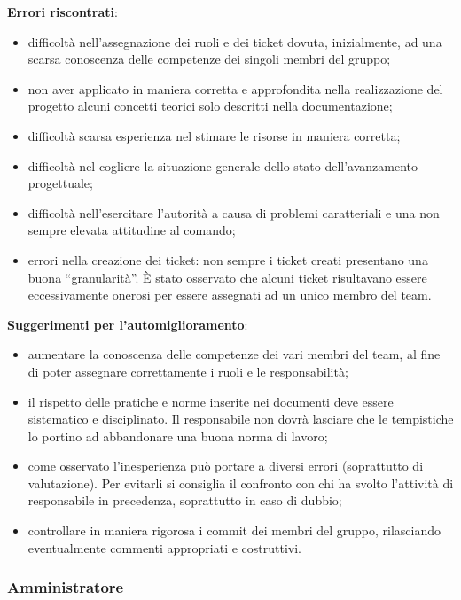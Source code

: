 \begin{description}
	\item \textbf{Errori riscontrati}:
		\begin{itemize}
			\item difficoltà nell'assegnazione dei ruoli e dei ticket dovuta, inizialmente, ad una scarsa conoscenza delle competenze dei singoli membri del gruppo;
			\item non aver applicato in maniera corretta e approfondita nella realizzazione del progetto alcuni concetti teorici solo descritti nella documentazione;
			\item difficoltà scarsa esperienza nel stimare le risorse in maniera corretta;
			\item difficoltà nel cogliere la situazione generale dello stato dell'avanzamento progettuale;
			\item difficoltà nell'esercitare l'autorità a causa di problemi caratteriali e una non sempre elevata attitudine al comando;
			\item errori nella creazione dei ticket: non sempre i ticket creati presentano una buona ``granularità''. È stato osservato che alcuni ticket risultavano essere eccessivamente onerosi per essere assegnati ad un unico membro del team.
		\end{itemize}
			
	\item \textbf{Suggerimenti per l'automiglioramento}:
		\begin{itemize}
			\item aumentare la conoscenza delle competenze dei vari membri del team, al fine di poter assegnare correttamente i ruoli e le responsabilità;
			\item il rispetto delle pratiche e norme inserite nei documenti deve essere sistematico e disciplinato. Il responsabile non dovrà lasciare che le tempistiche lo portino ad abbandonare una buona norma di lavoro;
			\item come osservato l'inesperienza può portare a diversi errori (soprattutto di valutazione). Per evitarli si consiglia il confronto con chi ha svolto l'attività di responsabile in precedenza, soprattutto in caso di dubbio;
			\item controllare in maniera rigorosa i commit dei membri del gruppo, rilasciando eventualmente commenti appropriati e costruttivi.
		\end{itemize}
\end{description}

\subsubsection{Amministratore}

